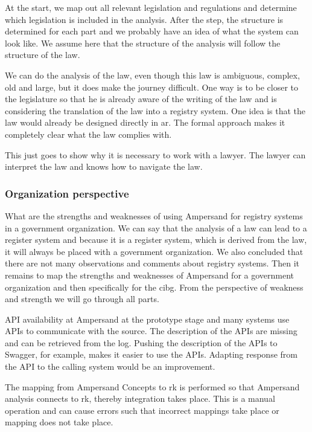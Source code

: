 At the start, we map out all relevant legislation and regulations and determine which legislation is included in the analysis.
After the step, the structure is determined for each part and we probably have an idea of what the system can look like.
We assume here that the structure of the analysis will follow the structure of the law.

We can do the analysis of the law, even though this law is ambiguous, complex, old and large, but it does make the journey difficult.
One way is to be closer to the legislature so that he is already aware of the writing of the law and is considering the translation of the law into a registry system.
One idea is that the law would already be designed directly in \acrshort{ar}.
The formal approach makes it completely clear what the law complies with.

This just goes to show why it is necessary to work with a lawyer.
The lawyer can interpret the law and knows how to navigate the law.

\subsubsection{Organization perspective}\label{subsub:organization_perspective}
What are the strengths and weaknesses of using Ampersand for registry systems in a government organization.
We can say that the analysis of a law can lead to a register system and because it is a register system, which is derived from the law, it will always be placed with a government organization.
We also concluded that there are not many observations and comments about registry systems.
Then it remains to map the strengths and weaknesses of Ampersand for a government organization and then specifically for the \acrshort{cibg}.
From the perspective of weakness and strength we will go through all parts.

API availability at Ampersand at the prototype stage and many systems use APIs to communicate with the source.
The description of the APIs are missing and can be retrieved from the log.
Pushing the description of the APIs to Swagger, for example, makes it easier to use the APIs.
Adapting response from the API to the calling system would be an improvement.

The mapping from Ampersand Concepts to \acrshort{rk} is performed so that Ampersand analysis connects to \acrshort{rk}, thereby integration takes place.
This is a manual operation and can cause errors such that incorrect mappings take place or mapping does not take place.

